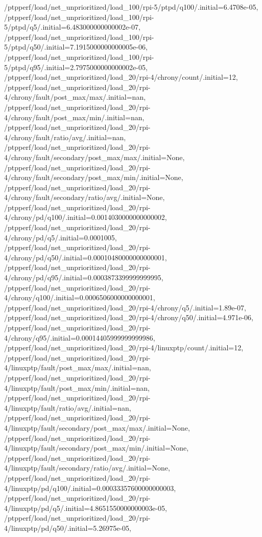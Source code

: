 {    /ptpperf/load/net_unprioritized/load_100/rpi-5/ptpd/q100/.initial=6.4708e-05,
    /ptpperf/load/net_unprioritized/load_100/rpi-5/ptpd/q5/.initial=6.483000000000002e-07,
    /ptpperf/load/net_unprioritized/load_100/rpi-5/ptpd/q50/.initial=7.1915000000000005e-06,
    /ptpperf/load/net_unprioritized/load_100/rpi-5/ptpd/q95/.initial=2.7975000000000002e-05,
    /ptpperf/load/net_unprioritized/load_20/rpi-4/chrony/count/.initial=12,
    /ptpperf/load/net_unprioritized/load_20/rpi-4/chrony/fault/post_max/max/.initial=nan,
    /ptpperf/load/net_unprioritized/load_20/rpi-4/chrony/fault/post_max/min/.initial=nan,
    /ptpperf/load/net_unprioritized/load_20/rpi-4/chrony/fault/ratio/avg/.initial=nan,
    /ptpperf/load/net_unprioritized/load_20/rpi-4/chrony/fault/secondary/post_max/max/.initial=None,
    /ptpperf/load/net_unprioritized/load_20/rpi-4/chrony/fault/secondary/post_max/min/.initial=None,
    /ptpperf/load/net_unprioritized/load_20/rpi-4/chrony/fault/secondary/ratio/avg/.initial=None,
    /ptpperf/load/net_unprioritized/load_20/rpi-4/chrony/pd/q100/.initial=0.0014030000000000002,
    /ptpperf/load/net_unprioritized/load_20/rpi-4/chrony/pd/q5/.initial=0.0001005,
    /ptpperf/load/net_unprioritized/load_20/rpi-4/chrony/pd/q50/.initial=0.00010480000000000001,
    /ptpperf/load/net_unprioritized/load_20/rpi-4/chrony/pd/q95/.initial=0.0003873399999999995,
    /ptpperf/load/net_unprioritized/load_20/rpi-4/chrony/q100/.initial=0.0006506000000000001,
    /ptpperf/load/net_unprioritized/load_20/rpi-4/chrony/q5/.initial=1.89e-07,
    /ptpperf/load/net_unprioritized/load_20/rpi-4/chrony/q50/.initial=4.971e-06,
    /ptpperf/load/net_unprioritized/load_20/rpi-4/chrony/q95/.initial=0.00014405999999999986,
    /ptpperf/load/net_unprioritized/load_20/rpi-4/linuxptp/count/.initial=12,
    /ptpperf/load/net_unprioritized/load_20/rpi-4/linuxptp/fault/post_max/max/.initial=nan,
    /ptpperf/load/net_unprioritized/load_20/rpi-4/linuxptp/fault/post_max/min/.initial=nan,
    /ptpperf/load/net_unprioritized/load_20/rpi-4/linuxptp/fault/ratio/avg/.initial=nan,
    /ptpperf/load/net_unprioritized/load_20/rpi-4/linuxptp/fault/secondary/post_max/max/.initial=None,
    /ptpperf/load/net_unprioritized/load_20/rpi-4/linuxptp/fault/secondary/post_max/min/.initial=None,
    /ptpperf/load/net_unprioritized/load_20/rpi-4/linuxptp/fault/secondary/ratio/avg/.initial=None,
    /ptpperf/load/net_unprioritized/load_20/rpi-4/linuxptp/pd/q100/.initial=0.00033357600000000003,
    /ptpperf/load/net_unprioritized/load_20/rpi-4/linuxptp/pd/q5/.initial=4.8651550000000003e-05,
    /ptpperf/load/net_unprioritized/load_20/rpi-4/linuxptp/pd/q50/.initial=5.26975e-05,
}

